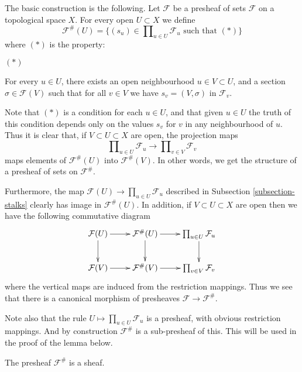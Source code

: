 \medskip\noindent
The basic construction is the following. Let $\mathcal{F}$ be a presheaf
of sets $\mathcal{F}$ on a topological space $X$.
For every open $U \subset X$ we define
$$
\mathcal{F}^{\#}(U)
=
\{
(s_u) \in \prod\nolimits_{u \in U} \mathcal{F}_u
\text{ such that }(*)
\}
$$
where $(*)$ is the property:
\begin{list}{$(*)$}{}
\item For every $u \in U$, there exists an open neighbourhood
$u \in V \subset U$, and a section $\sigma \in \mathcal{F}(V)$
such that for all $v \in V$ we have $s_v = (V, \sigma)$
in $\mathcal{F}_v$.
\end{list}
Note that $(*)$ is a condition for each $u \in U$,
and that given $u \in U$ the truth of this condition
depends only on the values $s_v$ for $v$ in any neighbourhood
of $u$. Thus it is clear that,
if $V \subset U \subset X$ are open, the projection maps
$$
\prod\nolimits_{u \in U} \mathcal{F}_u
\longrightarrow
\prod\nolimits_{v \in V} \mathcal{F}_v
$$
maps elements of $\mathcal{F}^{\#}(U)$
into $\mathcal{F}^{\#}(V)$. In other words,
we get the structure of a presheaf of sets
on $\mathcal{F}^{\#}$.

\medskip\noindent
Furthermore, the map $\mathcal{F}(U) \to \prod_{u \in U} \mathcal{F}_u$
described in Subsection \ref{subsection-stalks} clearly has image
in $\mathcal{F}^{\#}(U)$. In addition, if $V \subset U \subset X$ are
open then we have the following commutative diagram
$$
\xymatrix{
\mathcal{F}(U) \ar[r] \ar[d] &
\mathcal{F}^{\#}(U) \ar[r] \ar[d] &
\prod_{u\in U} \mathcal{F}_u \ar[d]\cr
\mathcal{F}(V) \ar[r] &
\mathcal{F}^{\#}(V) \ar[r] &
\prod_{v\in V} \mathcal{F}_v
}
$$
where the vertical maps are induced from the
restriction mappings. Thus we see that
there is a canonical morphism of presheaves
$\mathcal{F} \to \mathcal{F}^{\#}$.

\medskip\noindent
Note also that the rule $U \mapsto \prod_{u\in U} \mathcal{F}_u$
is a presheaf, with obvious restriction mappings. And by construction
$\mathcal{F}^{\#}$ is a sub-presheaf of this. This will be
used in the proof of the lemma below.

\begin{lemma}
\label{lemma-sheafification-sheaf}
The presheaf $\mathcal{F}^{\#}$ is a sheaf.
\end{lemma}

